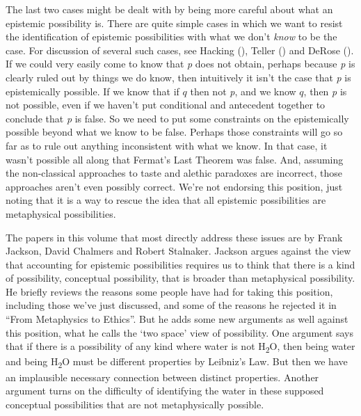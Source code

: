 \documentclass[
  11pt,
  letterpaper,
  DIV=11,
  numbers=noendperiod,
  twoside]{scrartcl}
\begin{document}
The last two cases might be dealt with by being more careful about what
an epistemic possibility is. There are quite simple cases in which we
want to resist the identification of epistemic possibilities with what
we don't \emph{know} to be the case. For discussion of several such
cases, see Hacking (), Teller
() and DeRose
(). If we could very easily come to know
that \emph{p} does not obtain, perhaps because \emph{p} is clearly ruled
out by things we do know, then intuitively it isn't the case that
\emph{p} is epistemically possible. If we know that if \(q\) then not
\emph{p}, and we know \(q\), then \emph{p} is not possible, even if we
haven't put conditional and antecedent together to conclude that
\emph{p} is false. So we need to put some constraints on the
epistemically possible beyond what we know to be false. Perhaps those
constraints will go so far as to rule out anything inconsistent with
what we know. In that case, it wasn't possible all along that Fermat's
Last Theorem was false. And, assuming the non-classical approaches to
taste and alethic paradoxes are incorrect, those approaches aren't even
possibly correct. We're not endorsing this position, just noting that it
is a way to rescue the idea that all epistemic possibilities are
metaphysical possibilities.

The papers in this volume that most directly address these issues are by
Frank Jackson, David Chalmers and Robert Stalnaker. Jackson argues
against the view that accounting for epistemic possibilities requires us
to think that there is a kind of possibility, conceptual possibility,
that is broader than metaphysical possibility. He briefly reviews the
reasons some people have had for taking this position, including those
we've just discussed, and some of the reasons he rejected it in ``From
Metaphysics to Ethics''. But he adds some new arguments as well against
this position, what he calls the `two space' view of possibility. One
argument says that if there is a possibility of any kind where water is
not H\textsubscript{2}O, then being water and being H\textsubscript{2}O
must be different properties by Leibniz's Law. But then we have an
implausible necessary connection between distinct properties. Another
argument turns on the difficulty of identifying the water in these
supposed conceptual possibilities that are not metaphysically possible.
\end{document}
